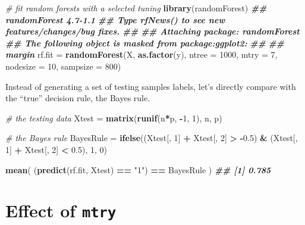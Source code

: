 \documentclass[
]{book}
\newenvironment{Shaded}{\begin{snugshade}}{\end{snugshade}}
\newcommand{\AttributeTok}[1]{\textcolor[rgb]{0.13,0.29,0.53}{#1}}
\newcommand{\CommentTok}[1]{\textcolor[rgb]{0.56,0.35,0.01}{\textit{#1}}}
\newcommand{\DecValTok}[1]{\textcolor[rgb]{0.00,0.00,0.81}{#1}}
\newcommand{\DocumentationTok}[1]{\textcolor[rgb]{0.56,0.35,0.01}{\textbf{\textit{#1}}}}
\newcommand{\FloatTok}[1]{\textcolor[rgb]{0.00,0.00,0.81}{#1}}
\newcommand{\FunctionTok}[1]{\textcolor[rgb]{0.13,0.29,0.53}{\textbf{#1}}}
\newcommand{\NormalTok}[1]{#1}
\newcommand{\OtherTok}[1]{\textcolor[rgb]{0.56,0.35,0.01}{#1}}
\newcommand{\SpecialCharTok}[1]{\textcolor[rgb]{0.81,0.36,0.00}{\textbf{#1}}}
\newcommand{\StringTok}[1]{\textcolor[rgb]{0.31,0.60,0.02}{#1}}
\theoremstyle{definition}
\theoremstyle{definition}
\theoremstyle{definition}
\theoremstyle{definition}
\theoremstyle{remark}
\begin{document}
\begin{Shaded}
\begin{Highlighting}[]
  \CommentTok{\# fit random forests with a selected tuning}
  \FunctionTok{library}\NormalTok{(randomForest)}
\DocumentationTok{\#\# randomForest 4.7{-}1.1}
\DocumentationTok{\#\# Type rfNews() to see new features/changes/bug fixes.}
\DocumentationTok{\#\# }
\DocumentationTok{\#\# Attaching package: \textquotesingle{}randomForest\textquotesingle{}}
\DocumentationTok{\#\# The following object is masked from \textquotesingle{}package:ggplot2\textquotesingle{}:}
\DocumentationTok{\#\# }
\DocumentationTok{\#\#     margin}
\NormalTok{  rf.fit }\OtherTok{=} \FunctionTok{randomForest}\NormalTok{(X, }\FunctionTok{as.factor}\NormalTok{(y), }\AttributeTok{ntree =} \DecValTok{1000}\NormalTok{, }
                        \AttributeTok{mtry =} \DecValTok{7}\NormalTok{, }\AttributeTok{nodesize =} \DecValTok{10}\NormalTok{, }\AttributeTok{sampsize =} \DecValTok{800}\NormalTok{)}
\end{Highlighting}
\end{Shaded}

Instead of generating a set of testing samples labels, let's directly compare with the ``true'' decision rule, the Bayes rule.

\begin{Shaded}
\begin{Highlighting}[]
  \CommentTok{\# the testing data }
\NormalTok{  Xtest }\OtherTok{=} \FunctionTok{matrix}\NormalTok{(}\FunctionTok{runif}\NormalTok{(n}\SpecialCharTok{*}\NormalTok{p, }\SpecialCharTok{{-}}\DecValTok{1}\NormalTok{, }\DecValTok{1}\NormalTok{), n, p)}
  
  \CommentTok{\# the Bayes rule}
\NormalTok{  BayesRule }\OtherTok{=} \FunctionTok{ifelse}\NormalTok{((Xtest[, }\DecValTok{1}\NormalTok{] }\SpecialCharTok{+}\NormalTok{ Xtest[, }\DecValTok{2}\NormalTok{] }\SpecialCharTok{\textgreater{}} \SpecialCharTok{{-}}\FloatTok{0.5}\NormalTok{) }\SpecialCharTok{\&} 
\NormalTok{                     (Xtest[, }\DecValTok{1}\NormalTok{] }\SpecialCharTok{+}\NormalTok{ Xtest[, }\DecValTok{2}\NormalTok{] }\SpecialCharTok{\textless{}} \FloatTok{0.5}\NormalTok{), }\DecValTok{1}\NormalTok{, }\DecValTok{0}\NormalTok{)}
  
  \FunctionTok{mean}\NormalTok{( (}\FunctionTok{predict}\NormalTok{(rf.fit, Xtest) }\SpecialCharTok{==} \StringTok{"1"}\NormalTok{) }\SpecialCharTok{==}\NormalTok{ BayesRule )}
\DocumentationTok{\#\# [1] 0.785}
\end{Highlighting}
\end{Shaded}

\hypertarget{effect-of-mtry}{%
\section{\texorpdfstring{Effect of \texttt{mtry}}{Effect of mtry}}\label{effect-of-mtry}}
\end{document}
